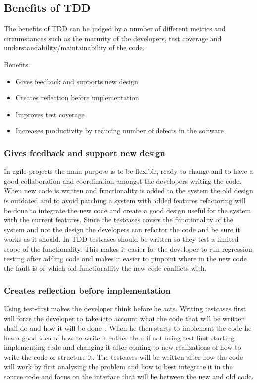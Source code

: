 \subsection{Benefits of TDD} 
The benefits of TDD can be judged by a number of different metrics and circumstances such as the maturity of the developers, test coverage and understandability/maintainability of the code.

Benefits:
\begin{itemize}
\item Gives feedback and supports new design
\item Creates reflection before implementation
\item Improves test coverage
\item Increases productivity by reducing number of defects in the software
\end{itemize}

\subsubsection*{Gives feedback and support new design}
In agile projects the main purpose is to be flexible, ready to change and to have a good collaboration and coordination amongst the developers writing the code. When new code is written and functionality is added to the system the old design is outdated and to avoid patching a system with added features refactoring will be done to integrate the new code and create a good design useful for the system with the current features. 
Since the testcases covers the functionality of the system and not the design the developers can refactor the code and be sure it works as it should. 
In TDD testcases should be written so they test a limited scope of the functionality. This makes it easier for the developer to run regression testing after adding code and makes it easier to pinpoint where in the new code the fault is or which old functionallity the new code conflicts with.

\subsubsection*{Creates reflection before implementation}
Using test-first makes the developer think before he acts. Writing testcases first will force the developer to take into account what the code that will be written shall do and how it will be done~\cite{erdogmus}. When he then starts to implement the code he has a good idea of how to write it rather than if not using test-first starting implementing code and changing it after coming to new realizations of how to write the code or structure it. The testcases will be written after how the code will work by first analysing the problem and how to best integrate it in the source code and focus on the interface that will be between the new and old code.

